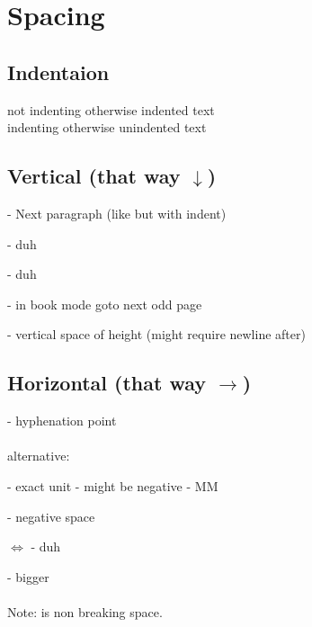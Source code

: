\section{Spacing}
\subsection{Indentaion}
\begin{example}
\noindent not indenting otherwise indented text\\
\indent indenting otherwise unindented text
\end{example}
\subsection[Vertical]{Vertical (that way $\downarrow$)}
\indent

\code{\par} - Next paragraph (like  \code{\\} but with indent)

\code{\newpage \pagebreak \clearpage} - duh

\code{\smallskip \medskip \bigskip } - duh

\code{\cleardoublepage} - in book mode goto next odd page

\code{\\[10cm] \vspace{10pt}} - vertical space of height (might require newline after)

\subsection[Horizontal]{Horizontal (that way $\rightarrow$)}
\indent

\code{\-} - hyphenation point\\
\\
alternative: 
\smallskip

\code{\hspace{10pt}} - exact unit - might be negative
 - M\hspace{-9pt}M

\code{\!} - negative space

\code{\thinspace \medspace \thickspace} $\iff$ \code{\, \: \;} - duh

\code{~ \ \quad \qquad} - bigger\\
\\
Note: \code{~} is non breaking space.


